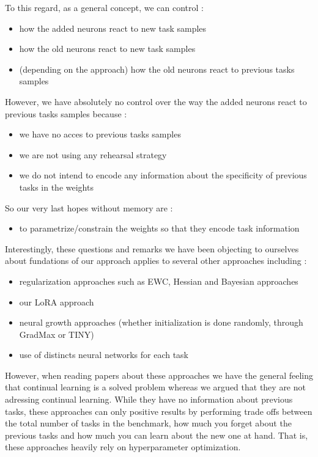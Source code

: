 \documentclass{article}
\begin{document}
\vspace{0.5cm}

\noindent
To this regard, as a general concept, we can control :
\begin{itemize}
    \item how the added neurons react to new task samples
    \item how the old neurons react to new task samples
    \item (depending on the approach) how the old neurons react to previous tasks samples
\end{itemize}

However, we have absolutely no control over the way the added neurons react to previous tasks samples because :
\begin{itemize}
    \item we have no acces to previous tasks samples
    \item we are not using any rehearsal strategy
    \item we do not intend to encode any information about the specificity of previous tasks in the weights 
\end{itemize}

So our very last hopes without memory are :
\begin{itemize}
    \item to parametrize/constrain the weights so that they encode task information
\end{itemize}

Interestingly, these questions and remarks we have been objecting to ourselves about fundations of our approach applies to several other approaches including :
\begin{itemize}
    \item regularization approaches such as EWC, Hessian and Bayesian approaches
    \item our LoRA approach
    \item neural growth approaches (whether initialization is done randomly, through GradMax or TINY)
    \item use of distincts neural networks for each task
\end{itemize}

However, when reading papers about these approaches we have the general feeling that continual learning is a solved problem whereas we argued that they are not adressing continual learning. While they have no information about previous tasks, these approaches can only positive results by performing trade offs between the total number of tasks in the benchmark, how much you forget about the previous tasks and how much you can learn about the new one at hand. That is, these approaches heavily rely on hyperparameter optimization.
\end{document}
